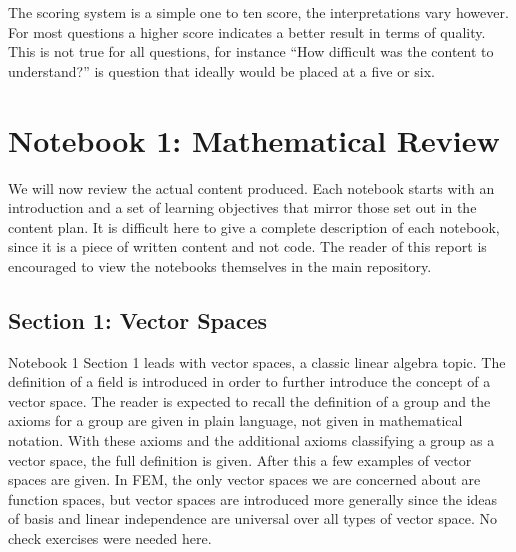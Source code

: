 The scoring system is a simple one to ten score, the interpretations vary however. For most questions a higher score indicates a better result in terms of quality. This is not true for all questions, for instance ``How difficult was the content to understand?'' is question that ideally would be placed at a five or six.

\section{Notebook 1: Mathematical Review} \label{section:notebook-1}

We will now review the actual content produced. Each notebook starts with an introduction and a set of learning objectives that mirror those set out in the content plan. It is difficult here to give a complete description of each notebook, since it is a piece of written content and not code. The reader of this report is encouraged to view the notebooks themselves in the main repository.

\subsection{Section 1: Vector Spaces}

Notebook 1 Section 1 leads with vector spaces, a classic linear algebra topic. The definition of a field is introduced in order to further introduce the concept of a vector space. The reader is expected to recall the definition of a group and the axioms for a group are given in plain language, not given in mathematical notation. With these axioms and the additional axioms classifying a group as a vector space, the full definition is given. After this a few examples of vector spaces are given. In FEM, the only vector spaces we are concerned about are function spaces, but vector spaces are introduced more generally since the ideas of basis and linear independence are universal over all types of vector space. No check exercises were needed here.

